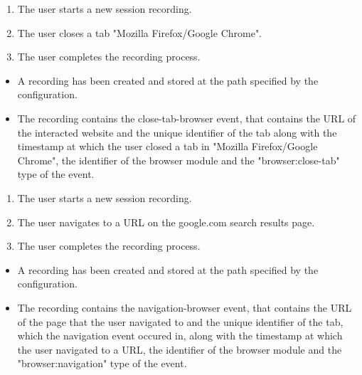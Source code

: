 \begin{tests}
	{\begin{enumerate}
		\item The \gls{user} starts a new \gls{session} recording.
		\item The \gls{user} closes a tab "Mozilla Firefox/Google Chrome".
		\item The \gls{user} completes the recording process.
	\end{enumerate}}
	{\begin{itemize}
		\item A recording has been created and stored at the path specified by the configuration.
		\item The recording contains the close-tab-browser \gls{event},  that contains the URL of the interacted website and the unique identifier of the tab along with the timestamp at which the \gls{user} closed a tab in "Mozilla Firefox/Google Chrome", the identifier of the \gls{browser} module and the "browser:close-tab" type of the event.
	\end{itemize}}
\newpage	
	{\begin{enumerate}
		\item The \gls{user} starts a new \gls{session} recording.
		\item The \gls{user} navigates to a URL on the google.com search results page.
		\item The \gls{user} completes the recording process.
	\end{enumerate}}
	{\begin{itemize}
		\item A recording has been created and stored at the path specified by the configuration.
		\item The recording contains the navigation-browser \gls{event},  that contains the URL of the page that the \gls{user} navigated to and the unique identifier of the tab, which the navigation \gls{event} occured in, along with the timestamp at which the \gls{user} navigated to a URL, the identifier of the \gls{browser} module and the "browser:navigation" type of the event.
	\end{itemize}}
	

\end{tests}

